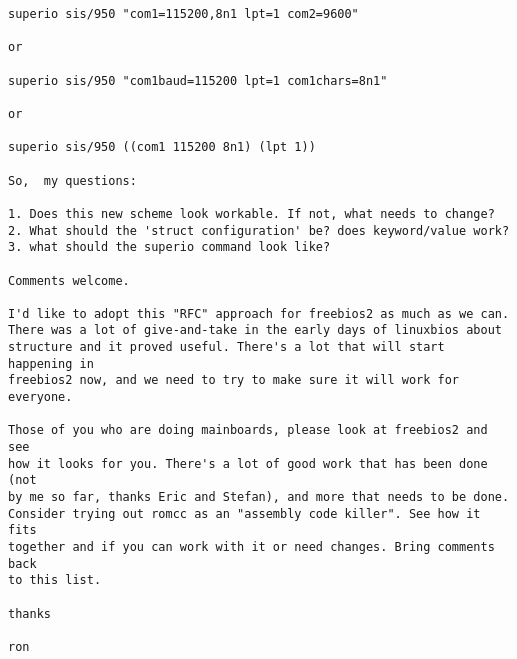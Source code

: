 \begin{verbatim}
superio sis/950 "com1=115200,8n1 lpt=1 com2=9600"

or

superio sis/950 "com1baud=115200 lpt=1 com1chars=8n1"

or

superio sis/950 ((com1 115200 8n1) (lpt 1))

So,  my questions:

1. Does this new scheme look workable. If not, what needs to change?
2. What should the 'struct configuration' be? does keyword/value work?
3. what should the superio command look like?

Comments welcome.

I'd like to adopt this "RFC" approach for freebios2 as much as we can.
There was a lot of give-and-take in the early days of linuxbios about
structure and it proved useful. There's a lot that will start happening in
freebios2 now, and we need to try to make sure it will work for everyone.

Those of you who are doing mainboards, please look at freebios2 and see
how it looks for you. There's a lot of good work that has been done (not
by me so far, thanks Eric and Stefan), and more that needs to be done.
Consider trying out romcc as an "assembly code killer". See how it fits
together and if you can work with it or need changes. Bring comments back
to this list.

thanks

ron

\end{verbatim}
